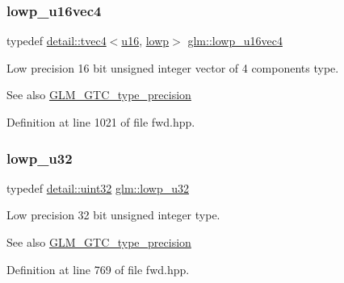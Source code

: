 \subsubsection{\texorpdfstring{lowp\+\_\+u16vec4}{lowp\_u16vec4}}
{\footnotesize\ttfamily typedef \hyperlink{structglm_1_1detail_1_1tvec4}{detail\+::tvec4}$<$\hyperlink{group__gtc__type__precision_gae7a1571503f83d2264ddfa705a6b082a}{u16}, \hyperlink{namespaceglm_a0f04f086094c747d227af4425893f545ae161af3fc695e696ce3bf69f7332bc2d}{lowp}$>$ \hyperlink{group__gtc__type__precision_gab0210f390e7d75fa8eb42128a05ff23a}{glm\+::lowp\+\_\+u16vec4}}

Low precision 16 bit unsigned integer vector of 4 components type. \begin{DoxySeeAlso}{See also}
\hyperlink{group__gtc__type__precision}{G\+L\+M\+\_\+\+G\+T\+C\+\_\+type\+\_\+precision} 
\end{DoxySeeAlso}


Definition at line 1021 of file fwd.\+hpp.

\mbox{\label{group__gtc__type__precision_gaba06fae1dd98ca50c017e68345df0365}} 
\subsubsection{\texorpdfstring{lowp\+\_\+u32}{lowp\_u32}}
{\footnotesize\ttfamily typedef \hyperlink{namespaceglm_1_1detail_ade6cfbf377022aaa391af8cd50489222}{detail\+::uint32} \hyperlink{group__gtc__type__precision_gaba06fae1dd98ca50c017e68345df0365}{glm\+::lowp\+\_\+u32}}

Low precision 32 bit unsigned integer type. \begin{DoxySeeAlso}{See also}
\hyperlink{group__gtc__type__precision}{G\+L\+M\+\_\+\+G\+T\+C\+\_\+type\+\_\+precision} 
\end{DoxySeeAlso}


Definition at line 769 of file fwd.\+hpp.

\mbox{\label{group__gtc__type__precision_ga579d71c2ae1225b689aaab0bc7d33146}} 
